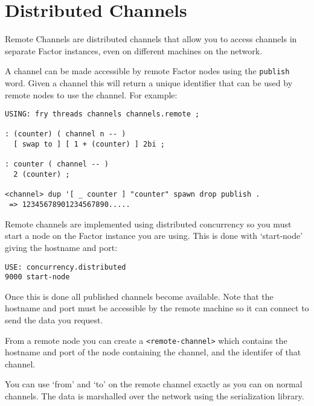 \chapter{Distributed Channels}\label{dchannels}

Remote Channels are distributed channels that allow you to access
channels in separate Factor instances, even on different machines on
the network. 


A channel can be made accessible by remote Factor nodes using the
\texttt{publish} word. Given a channel this will return a unique
identifier that can be used by remote nodes to use the channel. For
example:

\begin{verbatim}
USING: fry threads channels channels.remote ;

: (counter) ( channel n -- )
  [ swap to ] [ 1 + (counter) ] 2bi ;
    
: counter ( channel -- )
  2 (counter) ;    

<channel> dup '[ _ counter ] "counter" spawn drop publish .
 => 12345678901234567890.....
\end{verbatim}

Remote channels are implemented using
distributed concurrency so you must start a node on the Factor
instance you are using. This is done with `start-node' giving the
hostname and port:


\begin{verbatim}
USE: concurrency.distributed
9000 start-node
\end{verbatim}

Once this is done all published channels become available. Note that
the hostname and port must be accessible by the remote machine so it
can connect to send the data you request.

From a remote node you can create a \texttt{<remote-channel>} which contains
the hostname and port of the node containing the channel, and the identifer
of that channel.

You can use `from' and `to' on the remote channel exactly as you can
on normal channels. The data is marshalled over the network using the
serialization library.  

